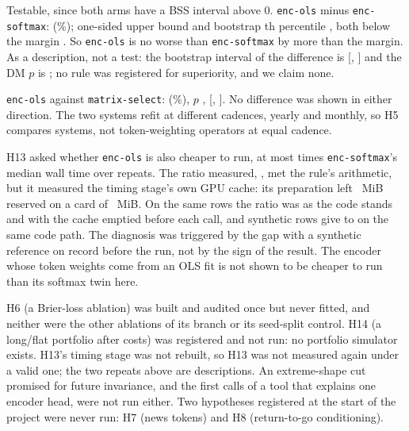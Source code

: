 \documentclass[11pt]{article}
\newcommand{\code}[1]{\texttt{#1}}
\newcommand{\pct}{\%}
\begin{document}
\begin{description}[leftmargin=0pt, style=sameline]
\item[H4 holds, as non-inferiority.] Testable, since both arms have a BSS interval above 0.
  \code{enc-ols} minus \code{enc-softmax}: \NumHfourDiff{} (\NumHfourPct\pct); one-sided upper bound
  \NumHfourUB{} and bootstrap \NumQuantPct th percentile \NumHfourQ, both below the margin \NumHfourMargin. So
  \code{enc-ols} is no worse than \code{enc-softmax} by more than the margin. As a description, not
  a test: the bootstrap interval of the difference is [\NumHfourLo, \NumHfourHi] and the DM $p$ is
  \NumHfourP; no rule was registered for superiority, and we claim none.
\item[H5 does not hold.] \code{enc-ols} against \code{matrix-select}: \NumHfiveDiff{}
  (\NumHfivePct\pct), $p$ \NumHfiveP, [\NumHfiveLo, \NumHfiveHi]. No difference was shown in either
  direction. The two systems refit at different cadences, yearly and monthly, so H5 compares systems,
  not token-weighting operators at equal cadence.
\item[H13: no verdict, the measurement is invalid.] H13 asked whether \code{enc-ols} is also cheaper
  to run, at most \NumHthirteenBound{} times \code{enc-softmax}'s median wall time over
  \NumHthirteenRepeats{} repeats. The ratio measured, \NumHthirteenRatio, met the rule's arithmetic,
  but it measured the timing stage's own GPU cache: its preparation left \NumCacheReserved{}~MiB
  reserved on a card of \NumCardTotal~MiB. On the same rows the ratio was \NumRatioAsIs{} as the code
  stands and \NumRatioEmptied{} with the cache emptied before each call, and synthetic rows give
  \NumRatioSynthLo{} to \NumRatioSynthHi{} on the same code path. The diagnosis was triggered by the
  gap with a synthetic reference on record before the run, not by the sign of the result. The encoder whose token weights come from an OLS fit is not shown
  to be cheaper to run than its softmax twin here.
\item[Not run.] H6 (a Brier-loss ablation) was built and audited once but never fitted, and neither
  were the other ablations of its branch or its seed-split control. H14 (a long/flat portfolio
  after costs) was registered and not run: no portfolio simulator exists. H13's timing stage was
  not rebuilt, so H13 was not measured again under a valid one; the two repeats above are
  descriptions. An extreme-shape cut promised for future invariance, and the first calls of a
  tool that explains one encoder head, were not run either. Two hypotheses registered at the
  start of the project were never run: H7 (news tokens) and H8 (return-to-go conditioning).
\end{description}
\end{document}

